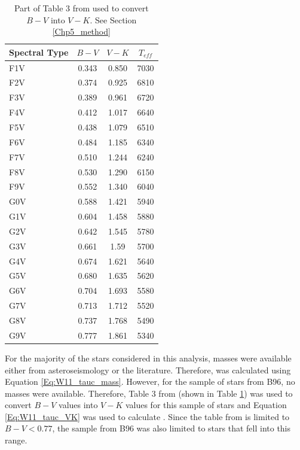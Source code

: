 \begin{table}[t]
\centering
\begin{tabular}{lccc}
\hline
Spectral Type & $B-V$   & $V-K$  & $T_{eff}$ \\
\hline
F1V        & 0.343 & 0.850  & 7030 \\
F2V        & 0.374 & 0.925 & 6810 \\
F3V        & 0.389 & 0.961 & 6720 \\
F4V        & 0.412 & 1.017 & 6640 \\
F5V        & 0.438 & 1.079 & 6510 \\
F6V        & 0.484 & 1.185 & 6340 \\
F7V        & 0.510  & 1.244 & 6240 \\
F8V        & 0.530  & 1.290  & 6150 \\
F9V        & 0.552 & 1.340  & 6040 \\
G0V        & 0.588 & 1.421 & 5940 \\
G1V        & 0.604 & 1.458 & 5880 \\
G2V        & 0.642 & 1.545 & 5780 \\
G3V        & 0.661 & 1.59  & 5700 \\
G4V        & 0.674 & 1.621 & 5640 \\
G5V        & 0.680  & 1.635 & 5620 \\
G6V        & 0.704 & 1.693 & 5580 \\
G7V        & 0.713 & 1.712 & 5520 \\
G8V        & 0.737 & 1.768 & 5490 \\
G9V        & 0.777 & 1.861 & 5340 \\
\hline
\end{tabular}
\caption[\citet{Pecaut_etal_2012} table for colour conversion]{Part of Table 3 from \citet{Pecaut_etal_2012} used to convert $B-V$ into $V-K$. See Section \ref{Chp5_method}}
\label{Pecaut_table3}
\end{table}

For the majority of the stars considered in this analysis, masses were available either from asteroseismology or the literature. Therefore, \tauc was calculated using Equation \ref{Eq:W11_tauc_mass}. However, for the sample of stars from B96, no masses were available. Therefore, Table 3 from \citet{Pecaut_etal_2012} (shown in Table \ref{Pecaut_table3}) was used to convert $B-V$ values into $V-K$ values for this sample of stars and Equation \ref{Eq:W11_tauc_VK} was used to calculate \tauc. Since the table from \citet{Pecaut_etal_2012} is limited to $B-V < 0.77$, the sample from B96 was also limited to stars that fell into this range.

